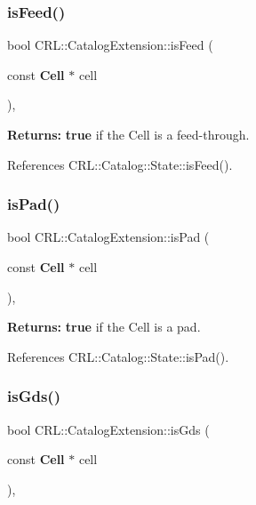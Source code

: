 \subsubsection{\texorpdfstring{is\+Feed()}{isFeed()}}
{\footnotesize\ttfamily bool C\+R\+L\+::\+Catalog\+Extension\+::is\+Feed (\begin{DoxyParamCaption}\item[{const \textbf{ Cell} $\ast$}]{cell }\end{DoxyParamCaption})\hspace{0.3cm}{\ttfamily [inline]}, {\ttfamily [static]}}

{\bfseries Returns\+:} {\bfseries true} if the Cell is a feed-\/through. 

References C\+R\+L\+::\+Catalog\+::\+State\+::is\+Feed().

\mbox{\label{classCRL_1_1CatalogExtension_a2695acabeac2f224fa4ac3a9563aeee9}} 
\subsubsection{\texorpdfstring{is\+Pad()}{isPad()}}
{\footnotesize\ttfamily bool C\+R\+L\+::\+Catalog\+Extension\+::is\+Pad (\begin{DoxyParamCaption}\item[{const \textbf{ Cell} $\ast$}]{cell }\end{DoxyParamCaption})\hspace{0.3cm}{\ttfamily [inline]}, {\ttfamily [static]}}

{\bfseries Returns\+:} {\bfseries true} if the Cell is a pad. 

References C\+R\+L\+::\+Catalog\+::\+State\+::is\+Pad().

\mbox{\label{classCRL_1_1CatalogExtension_a37c8d304e7386ee31b73c826cb929e5f}} 
\subsubsection{\texorpdfstring{is\+Gds()}{isGds()}}
{\footnotesize\ttfamily bool C\+R\+L\+::\+Catalog\+Extension\+::is\+Gds (\begin{DoxyParamCaption}\item[{const \textbf{ Cell} $\ast$}]{cell }\end{DoxyParamCaption})\hspace{0.3cm}{\ttfamily [inline]}, {\ttfamily [static]}}

